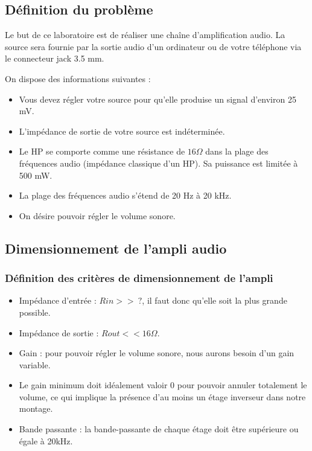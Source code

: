 \subsection{Définition du problème}
Le but de ce laboratoire est de réaliser une chaîne d'amplification audio.
La source sera fournie par la sortie audio d'un ordinateur ou de votre téléphone via le connecteur jack 3.5 mm.

On dispose des informations suivantes :
\vspace{3mm}
\begin{itemize}
\item Vous devez régler votre source pour qu'elle produise un signal d'environ 25 mV.
\item L'impédance de sortie de votre source est indéterminée.
\item Le HP se comporte comme une résistance de $16\Omega$ dans la plage des fréquences audio (impédance classique d'un HP). Sa puissance est limitée à 500 mW.
\item La plage des fréquences audio s'étend de 20 Hz à 20 kHz.
\item On désire pouvoir régler le volume sonore.
\end{itemize}


\subsection{Dimensionnement de l'ampli audio}
\label{Dimensionnement}

\subsubsection{Définition des critères de dimensionnement de l'ampli}

\begin{itemize}
\item Impédance d'entrée : $Rin >>\ ?$, il faut donc qu'elle soit la plus grande possible.
\item Impédance de sortie : $Rout << 16\Omega$.
\item Gain : pour pouvoir régler le volume sonore, nous aurons besoin d'un gain variable.
\item Le gain minimum doit idéalement valoir 0 pour pouvoir annuler totalement le volume, ce qui implique la présence d'au moins un étage inverseur dans notre montage.
\item Bande passante : la bande-passante de chaque étage doit être supérieure ou égale à 20kHz.
\end{itemize}

